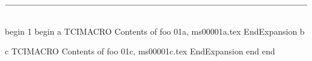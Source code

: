                       

\chaphead[1, My Title]%
\secthead[1.3, My Section]%

$\rule[18pt]{474pt}{0.5pt}\vspace{-15pt}$

begin
1
begin
a
TCIMACRO
Contents of foo 01a, ms00001a.tex
EndExpansion
b
%

c
TCIMACRO
Contents of foo 01c, ms00001c.tex
EndExpansion
end
end
